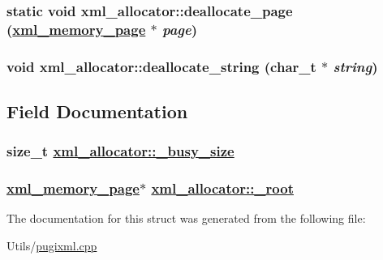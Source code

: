 \hypertarget{structxml__allocator_1c6bfe15a257a094f55659f8d71c209e}{
\subsubsection[deallocate\_\-page]{\setlength{\rightskip}{0pt plus 5cm}static void xml\_\-allocator::deallocate\_\-page (\hyperlink{structxml__memory__page}{xml\_\-memory\_\-page} $\ast$ {\em page})}}
\label{structxml__allocator_1c6bfe15a257a094f55659f8d71c209e}


\hypertarget{structxml__allocator_f32c538db4d562c2d0bfe15f7c0aa879}{
\subsubsection[deallocate\_\-string]{\setlength{\rightskip}{0pt plus 5cm}void xml\_\-allocator::deallocate\_\-string (char\_\-t $\ast$ {\em string})}}
\label{structxml__allocator_f32c538db4d562c2d0bfe15f7c0aa879}




\subsection{Field Documentation}
\hypertarget{structxml__allocator_4908b4aaa8cbbc3bf936ab8a938053c0}{
\subsubsection[\_\-busy\_\-size]{\setlength{\rightskip}{0pt plus 5cm}size\_\-t \hyperlink{structxml__allocator_4908b4aaa8cbbc3bf936ab8a938053c0}{xml\_\-allocator::\_\-busy\_\-size}}}
\label{structxml__allocator_4908b4aaa8cbbc3bf936ab8a938053c0}


\hypertarget{structxml__allocator_38082e85b23743620a257f997a00bb69}{
\subsubsection[\_\-root]{\setlength{\rightskip}{0pt plus 5cm}\hyperlink{structxml__memory__page}{xml\_\-memory\_\-page}$\ast$ \hyperlink{structxml__allocator_38082e85b23743620a257f997a00bb69}{xml\_\-allocator::\_\-root}}}
\label{structxml__allocator_38082e85b23743620a257f997a00bb69}




The documentation for this struct was generated from the following file:\begin{CompactItemize}
\item 
Utils/\hyperlink{pugixml_8cpp}{pugixml.cpp}\end{CompactItemize}
